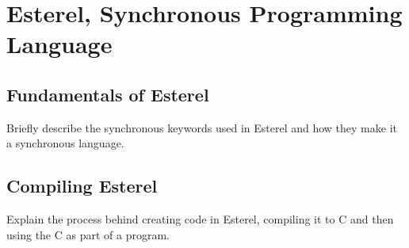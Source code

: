 \section{Esterel, Synchronous Programming Language}
\subsection{Fundamentals of Esterel}
Briefly describe the synchronous keywords used in Esterel and how they make it a synchronous language.

\subsection{Compiling Esterel}
Explain the process behind creating code in Esterel, compiling it to C and then using the C as part of a program.

